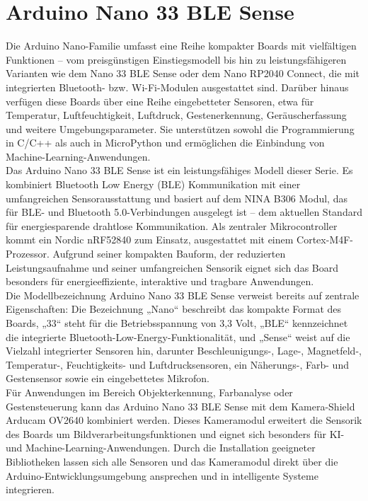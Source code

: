 \section{Arduino Nano 33 BLE Sense}

Die Arduino Nano-Familie umfasst eine Reihe kompakter Boards mit vielfältigen Funktionen – vom preisgünstigen Einstiegsmodell bis hin zu leistungsfähigeren Varianten wie dem Nano 33 BLE Sense oder dem Nano RP2040 Connect, die mit integrierten Bluetooth- bzw. Wi-Fi-Modulen ausgestattet sind. Darüber hinaus verfügen diese Boards über eine Reihe eingebetteter Sensoren, etwa für Temperatur, Luftfeuchtigkeit, Luftdruck, Gestenerkennung, Geräuscherfassung und weitere Umgebungsparameter. Sie unterstützen sowohl die Programmierung in C/C++ als auch in MicroPython und ermöglichen die Einbindung von Machine-Learning-Anwendungen.\\

Das Arduino Nano 33 BLE Sense ist ein leistungsfähiges Modell dieser Serie. Es kombiniert Bluetooth Low Energy (BLE) Kommunikation mit einer umfangreichen Sensorausstattung und basiert auf dem NINA B306 Modul, das für BLE- und Bluetooth 5.0-Verbindungen ausgelegt ist – dem aktuellen Standard für energiesparende drahtlose Kommunikation. Als zentraler Mikrocontroller kommt ein Nordic nRF52840 zum Einsatz, ausgestattet mit einem Cortex-M4F-Prozessor. Aufgrund seiner kompakten Bauform, der reduzierten Leistungsaufnahme und seiner umfangreichen Sensorik eignet sich das Board besonders für energieeffiziente, interaktive und tragbare Anwendungen.\\

Die Modellbezeichnung Arduino Nano 33 BLE Sense verweist bereits auf zentrale Eigenschaften: Die Bezeichnung „Nano“ beschreibt das kompakte Format des Boards, „33“ steht für die Betriebsspannung von 3,3 Volt, „BLE“ kennzeichnet die integrierte Bluetooth-Low-Energy-Funktionalität, und „Sense“ weist auf die Vielzahl integrierter Sensoren hin, darunter Beschleunigungs-, Lage-, Magnetfeld-, Temperatur-, Feuchtigkeits- und Luftdrucksensoren, ein Näherungs-, Farb- und Gestensensor sowie ein eingebettetes Mikrofon.\\

Für Anwendungen im Bereich Objekterkennung, Farbanalyse oder Gestensteuerung kann das Arduino Nano 33 BLE Sense mit dem Kamera-Shield Arducam OV2640 kombiniert werden. Dieses Kameramodul erweitert die Sensorik des Boards um Bildverarbeitungsfunktionen und eignet sich besonders für KI- und Machine-Learning-Anwendungen. Durch die Installation geeigneter Bibliotheken lassen sich alle Sensoren und das Kameramodul direkt über die Arduino-Entwicklungsumgebung ansprechen und in intelligente Systeme integrieren.


